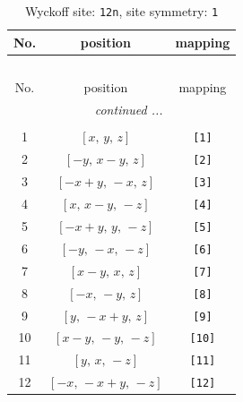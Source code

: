 \documentclass[fleqn,8pt]{jsarticle}
\begin{document}
\begin{longtable}{ccc}
\caption{Wyckoff site: {\tt 12n}, site symmetry: {\tt 1}}
 \\
 \hline \hline
No. & position & mapping \\ \hline \endfirsthead

\multicolumn{2}{l}{\tablename\ \thetable{}} \\
 \hline \hline
No. & position & mapping \\ \hline \endhead

 \hline \hline
\multicolumn{2}{r}{\footnotesize\it continued ...} \\ \endfoot

 \hline \hline
\multicolumn{2}{r}{} \\ \endlastfoot

1 & $\left[ x,\, y,\, z \right]$ & {\tt [1]} \\ \hline
2 & $\left[ - y,\, x - y,\, z \right]$ & {\tt [2]} \\ \hline
3 & $\left[ - x + y,\, - x,\, z \right]$ & {\tt [3]} \\ \hline
4 & $\left[ x,\, x - y,\, - z \right]$ & {\tt [4]} \\ \hline
5 & $\left[ - x + y,\, y,\, - z \right]$ & {\tt [5]} \\ \hline
6 & $\left[ - y,\, - x,\, - z \right]$ & {\tt [6]} \\ \hline
7 & $\left[ x - y,\, x,\, z \right]$ & {\tt [7]} \\ \hline
8 & $\left[ - x,\, - y,\, z \right]$ & {\tt [8]} \\ \hline
9 & $\left[ y,\, - x + y,\, z \right]$ & {\tt [9]} \\ \hline
10 & $\left[ x - y,\, - y,\, - z \right]$ & {\tt [10]} \\ \hline
11 & $\left[ y,\, x,\, - z \right]$ & {\tt [11]} \\ \hline
12 & $\left[ - x,\, - x + y,\, - z \right]$ & {\tt [12]} \\
\end{longtable}
\end{document}
